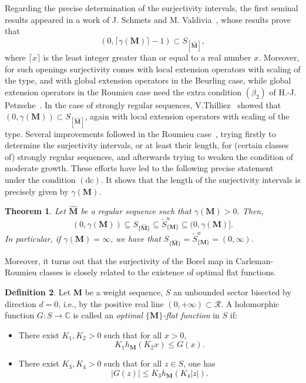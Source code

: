 \documentclass[11pt,a4paper]{article}
\theoremstyle{plain}
\newtheorem{theorem}{Theorem}[section]
\theoremstyle{definition}
\newtheorem{definition}[theorem]{Definition}
\numberwithin{equation}{section}
\newcommand{\C}{\mathbb{C}}
\newcommand{\M}{{\boldsymbol{M}}}
\newcommand{\hM}{\widehat{{\boldsymbol{M}}}}
\def\ga{\gamma}
\newcommand{\dc}{\operatorname{(dc)}}
\begin{document}
Regarding the precise determination of the surjectivity intervals, the first seminal results appeared in a work of J. Schmets and M. Valdivia~\cite{SchmetsValdivia00}, whose results prove that $$(0,\lceil\ga(\M)\rceil -1)\subset S_{[\hM]},$$
where $\lceil x\rceil$ is the least integer greater than or equal to a real number $x$. Moreover, for such openings surjectivity comes with local extension operators with scaling of the type, and with global extension operators in the Beurling case, while global extension operators in the Roumieu case need the extra condition $(\beta_2)$ of H.-J. Petzsche~\cite{Petzsche88}.
In the case of strongly regular sequences,  V.Thilliez~\cite{Thilliez03} showed that $(0,\ga(\M))\subset S_{[\hM]}$, again with local extension operators with scaling of the type. Several improvements followed in the Roumieu case~\cite{SanzFlatProxOrder,JimenezSanzSchindlInjectSurject,momentsdebrouwere,JimenezSanzSchindlSurjectDC}, trying firstly to determine the surjectivity intervals, or at least their length, for (certain classes of) strongly regular sequences, and afterwards trying to weaken the condition of moderate growth.
These efforts have led to the following precise statement~\cite[Th.~3.7]{JimenezSanzSchindlSurjectDC} under the condition $\dc$. It shows that the length of the surjectivity intervals is precisely given by $\ga(\M)$.

\begin{theorem}\label{teorSurject.dc}
Let $\hM$ be a regular sequence such that $\gamma(\M)>0$. Then,
$$(0,\gamma(\M))\subseteq S_{\{\hM\}}\subseteq \widetilde{S}^u_{\{\M\}}\subseteq
(0,\gamma(\M)].
$$
In particular, if $\gamma(\M)= \infty$, we have that $S_{\{\hM\}}= \widetilde{S}^u_{\{\M\}}= (0,\infty)$.
\end{theorem}

Moreover, it turns out that the surjectivity of the Borel map in Carleman-Roumieu classes is closely related to the existence of optimal flat functions.


\begin{definition}\label{optimalflatdef}
Let $\M$ be a weight sequence, $S$ an unbounded sector bisected by direction $d=0$, i.e., by the positive real line $(0,+\infty)\subset\mathcal{R}$. A holomorphic function $G\colon S\to\C$ is called an \emph{optimal $\{\M\}$-flat function} in $S$ if:
	\begin{itemize}
		\item[$(i)$] There exist $K_1,K_2>0$ such that for all $x>0$,
		\begin{equation}\label{optimalflatleft}
			K_1h_{\M}(K_2x)\le G(x).
		\end{equation}
		
		\item[$(ii)$] There exist $K_3,K_4>0$ such that for all $z\in S$, one has
		\begin{equation}\label{optimalflatright}
			|G(z)|\le K_3h_{\M}(K_4|z|).
		\end{equation}
	\end{itemize}
\end{definition}
\end{document}
